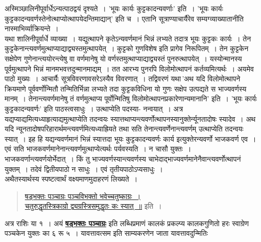 \documentclass[11pt, openany]{book}
\begin{document}
 अस्मिञ्छालिनीपूर्वार्धेऽन्यत्पाठद्वयं दृश्यते~। 'भूयः कार्यः
कुट्टकादन्यवर्णाः' 
इति~। 'भूयः कार्यः कुट्टकादन्यवर्णस्तेनोत्थाप्योत्थापयेदन्तिमाद्यान्'
इति च~। एतानि 
सूत्राण्याचार्यैरेव सम्यग्व्याख्यातानीति नास्माभिर्व्याक्रियन्ते~।\\

 \vspace{-4mm}
 यथा शालिनीपूर्वार्धे व्याख्या~। यद्युत्थापने कृतेऽन्यवर्णमानं भिन्नं
लभ्यते तदात्र भूयः कुट्टकः कार्यः~। तेन
कुट्टकेनान्त्यवर्णमुत्थाप्याद्याद्व्यस्तमुत्थापयेत्~।
कुट्टको गुणविशेष इति प्रागेव निरूपितम्~। तेन कुट्टकेन सक्षेपेण
गुणेनान्त्ययोरन्त्येषु 
वा वर्णमानेषु यो वर्णस्तमुत्थाप्याद्याद्व्यस्तं पुनरुत्थापयेत्~।
यस्योन्मानस्य 
पूर्वमुत्थापने भिन्नं मानमभवत्तदुन्मानमाद्यम्~। तत आरभ्य पुनरपि
विलोमोत्थापनं 
कर्तव्यमित्यर्थः~। अयमेव पाठो मुख्यः~। आचार्यैः सूत्रविवरणावसरेऽस्यैव
विवरणात्~। 
तद्विवरणं यथा\textendash \,{\qt 'अथ यदि विलोमोत्थापने क्रियमाणे पूर्ववर्णोन्मितौ तन्मितिर्भिन्ना लभ्यते तदा कुट्टकविधिना यो गुणः सक्षेप उत्पद्यते स भाज्यवर्णस्य मानम्~। तेनान्त्यवर्णमानेषु तं वर्णमुत्थाप्य पूर्वोन्मितिषु
विलोमोत्थापनप्रकारेणान्यमानानि'} इति~। 'भूयः कार्यः कुट्टकादन्यवर्णः' इति पाठस्त्वसाधुः~। उत्थाप्येति पदस्या-
\thispagestyle{empty}
\afterpage{\fancyhead[LE,RO]{\thepage}}
\cfoot{}
\newpage
\noindent नन्वयात्~। अत्र यद्यप्याद्यमित्यध्याहृत्याद्यमुत्थाप्येति तदन्वयः
स्यात्तथाप्यन्त्यवर्णोत्थापनस्यानुक्तेर्न्यूनतादोषः स्यादेव~। अथ यदि
न्यूनतादोषपरिहारार्थमन्त्यवर्णमित्यध्याह्रियते तथा सति तेनान्त्यवर्णेनान्त्यवर्णम् उत्थाप्येति तदन्वयः स्यात्~। इह
हि यद्यन्यवर्णमानं 
भिन्नं स्यात्तदा भूयः कुट्टकादन्यवर्णः कार्य इत्युक्तेरन्यवर्णो
भाजकवर्ण एव~। एवं सति भाजकवर्णमानेनान्त्यवर्णमुत्थाप्येत्यर्थः पर्यवस्यति~। न चासौ युक्तः~। भाजकवर्णान्त्यवर्णयोर्भेदात्~। किं तु भाज्यवर्णस्यान्त्यवर्णस्य
चाभेदाद्भाज्यवर्णमानेनैवान्त्यवर्णोत्थापनं युक्तम्~। तदेवं द्वितीयपाठो न साधुः~। एवं तृतीयपाठोऽप्यसाधुः~।\\

\vspace{-2mm}
 अथैतस्यार्थस्य स्पष्टत्वार्थं वक्ष्यमाणमुदाहरणं लिख्यते~। 
\begin{quote}
\hyperref[139]{षड्भक्तः पञ्चाग्रः पञ्चविभक्तो भवेच्चतुष्काग्रः~। \\
 चतुरुद्धृतस्त्रिकाग्रो द्व्यग्रस्त्रिसमुद्धृतः कः स्यात्~॥} इति~। 
\end{quote}

 अत्र राशिः या १~। अयं \hyperref[139]{\textbf{षड्भक्तः पञ्चाग्रः}} इति लब्धिप्रमाणं कालकं प्रकल्प्य कालकगुणितो हरः स्वाग्रेण पञ्चकेन युक्तः का ६ रू ५~। यावत्तावत्सम इति साम्यकरणेन जाता यावत्तावदुन्मितिः 
\vspace{-2mm}
\end{document}
